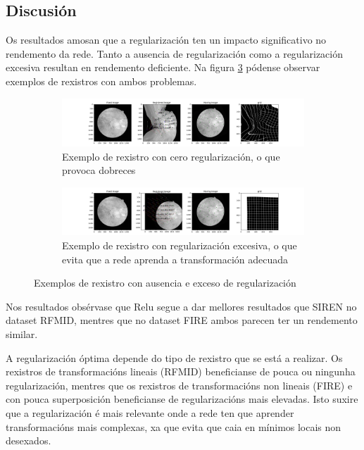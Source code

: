
\subsection{Discusión}
\label{subsec:Discusion-regularization}

Os resultados amosan que a regularización ten un impacto significativo no rendemento da rede. Tanto a ausencia de regularización como a regularización excesiva resultan en rendemento deficiente.
Na figura \ref{fig:regularization_examples} pódense observar exemplos de rexistros con ambos problemas.

\begin{figure}[tbp]
    \centering
    \begin{subfigure}[b]{0.45\textwidth}
        \centering
        \includegraphics[width=\textwidth]{imaxes/reg_examples/no_reg_example.png}
        \caption{Exemplo de rexistro con cero regularización, o que provoca dobreces}
        \label{fig:no_reg_example}
    \end{subfigure}\hfill
    \begin{subfigure}[b]{0.45\textwidth}
        \centering
        \includegraphics[width=\textwidth]{imaxes/reg_examples/too_much_reg_example.png}
        \caption{Exemplo de rexistro con regularización excesiva, o que evita que a rede aprenda a transformación adecuada}
        \label{fig:too_much_reg_example}
    \end{subfigure}
    \caption{Exemplos de rexistro con ausencia e exceso de regularización}
    \label{fig:regularization_examples}
\end{figure}

Nos resultados obsérvase que Relu segue a dar mellores resultados que SIREN no dataset RFMID, mentres que no dataset FIRE ambos parecen ter un rendemento similar.

A regularización óptima depende do tipo de rexistro que se está a realizar. Os rexistros de transformacións lineais (RFMID) beneficianse de pouca ou ningunha regularización, mentres que os rexistros de transformacións non lineais (FIRE) e con pouca superposición beneficianse de regularizacións mais elevadas.
Isto suxire que a regularización é mais relevante onde a rede ten que aprender transformacións mais complexas, xa que evita que caia en mínimos locais non desexados.

